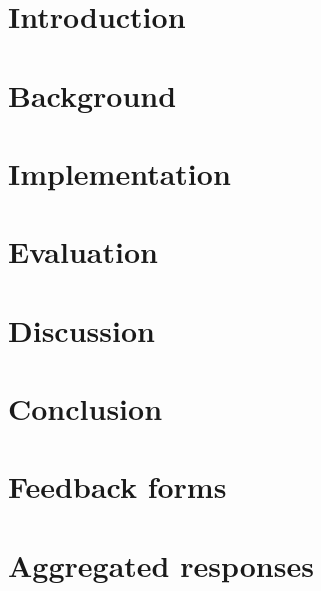\documentclass[bsc,frontabs,twoside,singlespacingi,parskip,deptreport]{infthesis}
\begin{document}
\tableofcontents


\chapter{Introduction}

\chapter{Background}

\chapter{Implementation}

\chapter{Evaluation}

\chapter{Discussion}

\chapter{Conclusion}



\appendix
\chapter{Feedback forms}


\chapter{Aggregated responses}


\end{document}
